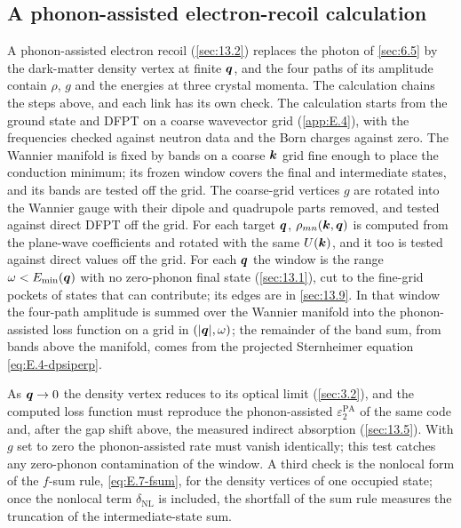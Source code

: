 \subsection{A phonon-assisted electron-recoil calculation}

A phonon-assisted electron recoil (\cref{sec:13.2}) replaces the photon of \cref{sec:6.5} by the dark-matter density vertex at finite $\bm{q}$, and the four paths of its amplitude contain $\rho$, $g$ and the energies at three crystal momenta. The calculation chains the steps above, and each link has its own check. The calculation starts from the ground state and DFPT on a coarse wavevector grid (\cref{app:E.4}), with the frequencies checked against neutron data and the Born charges against zero. The Wannier manifold is fixed by bands on a coarse $\bm{k}$ grid fine enough to place the conduction minimum; its frozen window covers the final and intermediate states, and its bands are tested off the grid. The coarse-grid vertices $g$ are rotated into the Wannier gauge with their dipole and quadrupole parts removed, and tested against direct DFPT off the grid. For each target $\bm{q}$, $\rho_{mn}(\bm{k},\bm{q})$ is computed from the plane-wave coefficients and rotated with the same $U(\bm{k})$, and it too is tested against direct values off the grid. For each $\bm{q}$ the window is the range $\omega < E_{\mathrm{min}}(\bm{q})$ with no zero-phonon final state (\cref{sec:13.1}), cut to the fine-grid pockets of states that can contribute; its edges are in \cref{sec:13.9}. In that window the four-path amplitude is summed over the Wannier manifold into the phonon-assisted loss function on a grid in $(|\bm{q}|,\omega)$; the remainder of the band sum, from bands above the manifold, comes from the projected Sternheimer equation \cref{eq:E.4-dpsiperp}.

As $\bm{q}\to0$ the density vertex reduces to its optical limit (\cref{sec:3.2}), and the computed loss function must reproduce the phonon-assisted $\varepsilon_2^{\mathrm{PA}}$ of the same code and, after the gap shift above, the measured indirect absorption (\cref{sec:13.5}). With $g$ set to zero the phonon-assisted rate must vanish identically; this test catches any zero-phonon contamination of the window. A third check is the nonlocal form of the $f$-sum rule, \cref{eq:E.7-fsum}, for the density vertices of one occupied state; once the nonlocal term $\delta_{\mathrm{NL}}$ is included, the shortfall of the sum rule measures the truncation of the intermediate-state sum.

